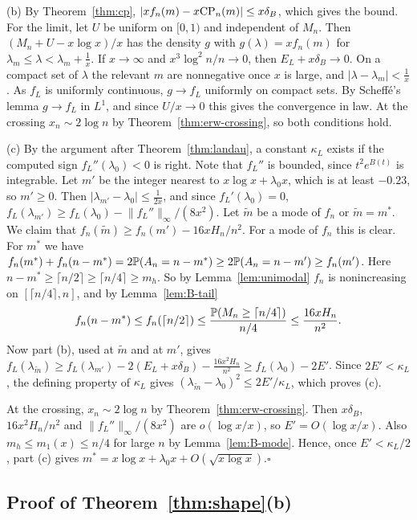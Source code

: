 (b) By Theorem~\ref{thm:cp},
$\lvert xf_n(m)-x\mathrm{CP}_n(m)\rvert\le x\delta_B$, which gives the bound. For
the limit, let $U$ be uniform on $[0,1)$ and independent of $M_n$. Then
$(M_n+U-x\log x)/x$ has the density $g$ with $g(\lambda)=xf_n(m)$ for
$\lambda_m\le\lambda<\lambda_m+\frac1x$. If $x\to\infty$ and
$x^3\log^2n/n\to0$, then $E_L+x\delta_B\to0$. On a compact set of
$\lambda$ the relevant $m$ are nonnegative once $x$ is large, and
$\lvert\lambda-\lambda_m\rvert<\frac1x$. As $f_L$ is uniformly continuous,
$g\to f_L$ uniformly on compact sets. By Scheff\'e's lemma
$g\to f_L$ in $L^1$, and since $U/x\to0$ this gives the convergence in law.
At the crossing $x_n\sim2\log n$ by Theorem~\ref{thm:erw-crossing}, so both
conditions hold.

(c) By the argument after Theorem~\ref{thm:landau}, a constant $\kappa_L$
exists if the computed sign $f_L''(\lambda_0)<0$ is right. Note that $f_L''$ is bounded, since $t^2e^{B(t)}$ is integrable. Let $m'$ be
the integer nearest to $x\log x+\lambda_0x$, which is at least $-0.23$, so
$m'\ge0$. Then $\lvert\lambda_{m'}-\lambda_0\rvert\le\frac1{2x}$, and since
$f_L'(\lambda_0)=0$,
$f_L(\lambda_{m'})\ge f_L(\lambda_0)-\lVert f_L''\rVert_\infty/(8x^2)$. Let
$\tilde m$ be a mode of $f_n$ or $\tilde m=m^*$. We claim that
$f_n(\tilde m)\ge f_n(m')-16xH_n/n^2$. For a mode of $f_n$ this is clear.
For $m^*$ we have
$f_n(m^*)+f_n(n-m^*)=2\mathbb{P}(A_n=n-m^*)\ge2\mathbb{P}(A_n=n-m')\ge f_n(m')$. Here
$n-m^*\ge\lceil n/2\rceil\ge\lceil n/4\rceil\ge m_h$. So by
Lemma~\ref{lem:unimodal} $f_n$ is nonincreasing on
$[\lceil n/4\rceil,n]$, and by Lemma~\ref{lem:B-tail}
\[
 f_n(n-m^*)\le f_n(\lceil n/2\rceil)\le\frac{\mathbb{P}(M_n\ge\lceil n/4\rceil)}{n/4}\le\frac{16xH_n}{n^2}.
\]
Now part (b), used at $\tilde m$ and at $m'$, gives
$f_L(\lambda_{\tilde m})\ge f_L(\lambda_{m'})-2(E_L+x\delta_B)-\frac{16x^2H_n}{n^2}\ge f_L(\lambda_0)-2E'$.
Since $2E'<\kappa_L$, the defining property of $\kappa_L$ gives
$(\lambda_{\tilde m}-\lambda_0)^2\le2E'/\kappa_L$, which proves (c).

At the crossing, $x_n\sim2\log n$ by Theorem~\ref{thm:erw-crossing}. Then
$x\delta_B$, $16x^2H_n/n^2$ and $\lVert f_L''\rVert_\infty/(8x^2)$ are
$o(\log x/x)$, so $E'=O(\log x/x)$. Also $m_h\le m_1(x)\le n/4$ for large
$n$ by Lemma~\ref{lem:B-mode}. Hence, once $E'<\kappa_L/2$, part (c) gives
$m^*=x\log x+\lambda_0x+O(\sqrt{x\log x})$.\hfill$\square$

\subsection{Proof of \texorpdfstring{Theorem~\ref{thm:shape}(b)}{Theorem 3.11(b)}}\label{app:shape-shape}

